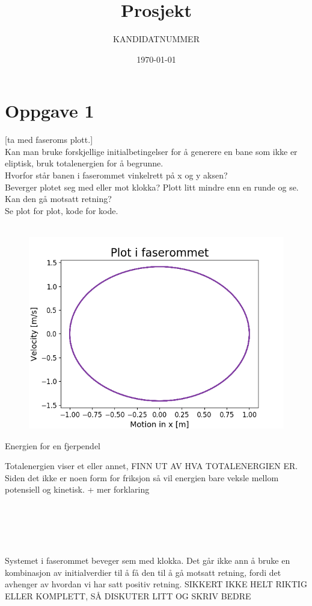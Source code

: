 \documentclass[norsk,a4paper,12pt]{article}
\title{Prosjekt}
\author{KANDIDATNUMMER}
\date{\today}
\begin{document}
\maketitle


\section*{Oppgave 1}
[ta med faseroms plott.]
\\
Kan man bruke forskjellige initialbetingelser for å generere en bane som ikke er eliptisk, bruk totalenergien for å begrunne.
\\
Hvorfor står banen i faserommet vinkelrett på x og y aksen?
\\
Beverger plotet seg med eller mot klokka? Plott litt mindre enn en runde og se. Kan den gå motsatt retning?
\\



Se plot for plot, kode for kode.
\\
\\
\begin{figure}[H]
\includegraphics[scale=0.8]{Oppgave1.png}
\end{figure}


Energien for en fjerpendel

Totalenergien viser et eller annet, FINN UT AV HVA TOTALENERGIEN ER. Siden det ikke er noen form for friksjon så vil energien bare veksle mellom potensiell og kinetisk. + mer forklaring
\\
\\
\\
\\
\\
\\
Systemet i faserommet beveger sem med klokka. Det går ikke ann å bruke en kombinasjon av initialverdier til å få den til å gå motsatt retning, fordi det avhenger av hvordan vi har satt positiv retning.  SIKKERT IKKE HELT RIKTIG ELLER KOMPLETT, SÅ DISKUTER LITT OG SKRIV BEDRE
\end{document}
